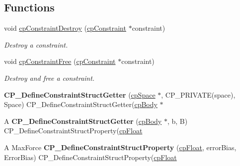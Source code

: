 \subsection*{Functions}
\begin{DoxyCompactItemize}
\item 
\hypertarget{group__cp_constraint_ga2c5c4d73886727485cb4d8c3e3ba1c15}{void \hyperlink{group__cp_constraint_ga2c5c4d73886727485cb4d8c3e3ba1c15}{cp\-Constraint\-Destroy} (\hyperlink{structcp_constraint}{cp\-Constraint} $\ast$constraint)}\label{group__cp_constraint_ga2c5c4d73886727485cb4d8c3e3ba1c15}

\begin{DoxyCompactList}\small\item\em Destroy a constraint. \end{DoxyCompactList}\item 
\hypertarget{group__cp_constraint_ga396e66d86ca72615ed681dfed3673a6c}{void \hyperlink{group__cp_constraint_ga396e66d86ca72615ed681dfed3673a6c}{cp\-Constraint\-Free} (\hyperlink{structcp_constraint}{cp\-Constraint} $\ast$constraint)}\label{group__cp_constraint_ga396e66d86ca72615ed681dfed3673a6c}

\begin{DoxyCompactList}\small\item\em Destroy and free a constraint. \end{DoxyCompactList}\item 
\hypertarget{group__cp_constraint_ga9ba51e99107179447411f7c7a9ab5184}{{\bfseries C\-P\-\_\-\-Define\-Constraint\-Struct\-Getter} (\hyperlink{structcp_space}{cp\-Space} $\ast$, C\-P\-\_\-\-P\-R\-I\-V\-A\-T\-E(space), Space) C\-P\-\_\-\-Define\-Constraint\-Struct\-Getter(\hyperlink{structcp_body}{cp\-Body} $\ast$}\label{group__cp_constraint_ga9ba51e99107179447411f7c7a9ab5184}

\item 
\hypertarget{group__cp_constraint_ga0c2aa9494ba1f25e4813904a00078748}{A {\bfseries C\-P\-\_\-\-Define\-Constraint\-Struct\-Getter} (\hyperlink{structcp_body}{cp\-Body} $\ast$, b, B) C\-P\-\_\-\-Define\-Constraint\-Struct\-Property(\hyperlink{group__basic_types_gac1ed65573e035bf892505768c852d8d3}{cp\-Float}}\label{group__cp_constraint_ga0c2aa9494ba1f25e4813904a00078748}

\item 
\hypertarget{group__cp_constraint_ga9d7983cdfbaf75b959c70359cc51b92a}{A Max\-Force {\bfseries C\-P\-\_\-\-Define\-Constraint\-Struct\-Property} (\hyperlink{group__basic_types_gac1ed65573e035bf892505768c852d8d3}{cp\-Float}, error\-Bias, Error\-Bias) C\-P\-\_\-\-Define\-Constraint\-Struct\-Property(\hyperlink{group__basic_types_gac1ed65573e035bf892505768c852d8d3}{cp\-Float}}\label{group__cp_constraint_ga9d7983cdfbaf75b959c70359cc51b92a}


\end{DoxyCompactItemize}
